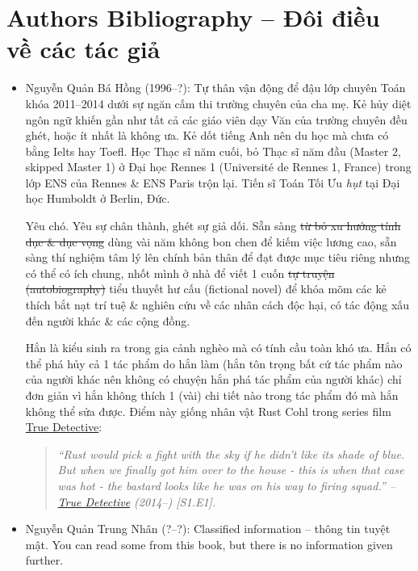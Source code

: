\documentclass[12pt]{article}
\begin{document}
\section{Authors Bibliography -- Đôi điều về các tác giả}

\begin{itemize}
	\item {\sc Nguyễn Quản Bá Hồng} (1996--?): Tự thân vận động để đậu lớp chuyên Toán khóa 2011--2014 dưới sự ngăn cấm thi trường chuyên của cha mẹ. Kẻ hủy diệt ngôn ngữ khiến gần như tất cả các giáo viên dạy Văn của trường chuyên đều ghét, hoặc ít nhất là không ưa. Kẻ dốt tiếng Anh nên du học mà chưa có bằng Ielts hay Toefl. Học Thạc sĩ năm cuối, bỏ Thạc sĩ năm đầu (Master 2, skipped Master 1) ở Đại học Rennes 1 (Universit\'e de Rennes 1, France) trong lớp ENS của Rennes \& ENS Paris trộn lại. Tiến sĩ Toán Tối Ưu {\it hụt} tại Đại học Humboldt ở Berlin, Đức.
	
	Yêu chó. Yêu sự chân thành, ghét sự giả dối. Sẵn sàng \st{từ bỏ xu hướng tính dục \& dục vọng} dùng vài năm không bon chen để kiếm việc lương cao, sẵn sàng thí nghiệm tâm lý lên chính bản thân để đạt được mục tiêu riêng nhưng có thể có ích chung, nhốt mình ở nhà để viết 1 cuốn \st{tự truyện (autobiography)} tiểu thuyết hư cấu (fictional novel) để khóa mõm các kẻ thích bắt nạt trí tuệ \& nghiên cứu về các nhân cách độc hại, có tác động xấu đến người khác \& các cộng đồng.
	
	Hắn là kiểu sinh ra trong gia cảnh nghèo mà có tính cầu toàn khó ưa. Hắn có thể phá hủy cả 1 tác phẩm do hắn làm (hắn tôn trọng bất cứ tác phẩm nào của người khác nên không có chuyện hắn phá tác phẩm của người khác) chỉ đơn giản vì hắn không thích 1 (vài) chi tiết nào trong tác phẩm đó mà hắn không thể sửa được. Điểm này giống nhân vật {\sc Rust Cohl} trong series film \href{https://www.imdb.com/title/tt2356777/}{True Detective}:
	\begin{quote}\it
		``Rust would pick a fight with the sky if he didn't like its shade of blue. But when we finally got him over to the house - this is when that case was hot - the bastard looks like he was on his way to firing squad.'' -- \href{https://www.imdb.com/title/tt2356777/}{True Detective} (2014--) [S1.E1].
	\end{quote}
	\item {\sc Nguyễn Quản Trung Nhân} (?--?): Classified information -- thông tin tuyệt mật. You can read some from this book, but there is no information given further.
\end{itemize}
\end{document}
